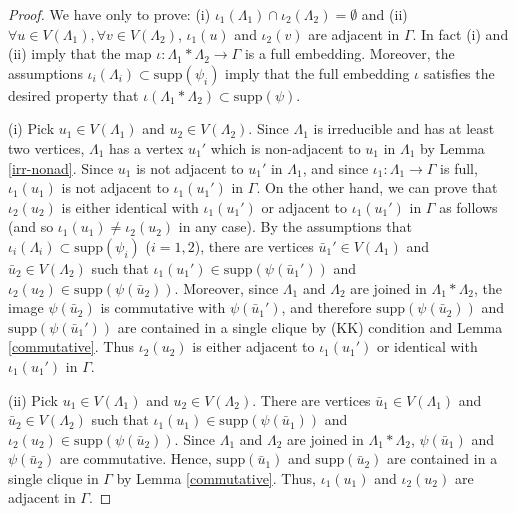 \documentclass{amsart}
\theoremstyle{definition}
\theoremstyle{plain}
\numberwithin{equation}{section}
\begin{document}
\begin{proof}
We have only to prove: (i) $\iota_1 (\Lambda_1) \cap \iota_2(\Lambda_2) = \emptyset$ and (ii) $\forall u \in V(\Lambda_1),  \forall v \in V(\Lambda_2)$, $\iota_1(u)$ and $\iota_2(v)$ are adjacent in $\Gamma$. 
In fact (i) and (ii) imply that the map $\iota \colon \Lambda_1 * \Lambda_2 \rightarrow \Gamma$ is a full embedding. 
Moreover, the assumptions $\iota_i(\Lambda_i) \subset \mathrm{supp}(\psi_i)$ imply that the full embedding $\iota$ satisfies the desired property that $\iota(\Lambda_1 * \Lambda_2) \subset \mathrm{supp}(\psi)$. 

(i) Pick $u_1 \in V(\Lambda_1)$ and $u_2 \in V(\Lambda_2)$. 
Since $\Lambda_1$ is irreducible and has at least two vertices, $\Lambda_1$ has a vertex $u_1'$ which is non-adjacent to $u_1$ in $\Lambda_1$ by Lemma \ref{irr-nonad}. 
Since $u_1$ is not adjacent to $u_1'$ in $\Lambda_1$, and since $\iota_1 \colon \Lambda_1 \rightarrow \Gamma$ is full, $\iota_1(u_1)$ is not adjacent to $\iota_1(u_1')$ in $\Gamma$. 
On the other hand, we can prove that $\iota_2(u_2)$ is either identical with $\iota_1(u_1')$ or adjacent to $\iota_1(u_1')$ in $\Gamma$ as follows (and so $\iota_1(u_1) \neq \iota_2(u_2)$ in any case).  
By the assumptions that $\iota_i(\Lambda_i) \subset \mathrm{supp}(\psi_i)$ ($i= 1,2$), there are vertices $\bar{u}_1' \in V(\Lambda_1)$ and $\bar{u}_2 \in V(\Lambda_2)$ such that $\iota_1(u_1') \in \mathrm{supp}(\psi(\bar{u}_1'))$ and $\iota_2(u_2) \in \mathrm{supp}(\psi(\bar{u}_2))$. 
Moreover, since $\Lambda_1$ and $\Lambda_2$ are joined in $\Lambda_1 * \Lambda_2$, the image $\psi(\bar{u}_2)$ is commutative with $\psi(\bar{u}_1')$, and therefore $\mathrm{supp}(\psi(\bar{u}_2))$ and $\mathrm{supp}(\psi(\bar{u}_1'))$ are contained in a single clique by (KK) condition and Lemma \ref{commutative}. 
Thus $\iota_2(u_2)$ is either adjacent to $\iota_1(u_1')$ or identical with $\iota_1(u_1')$ in $\Gamma$. 

(ii) Pick $u_1 \in V(\Lambda_1)$ and $u_2 \in V(\Lambda_2)$. 
There are vertices $\bar{u}_1 \in V(\Lambda_1)$ and $\bar{u}_2 \in V(\Lambda_2)$ such that $\iota_1(u_1) \in \mathrm{supp}(\psi(\bar{u}_1))$ and $\iota_2(u_2) \in \mathrm{supp}(\psi(\bar{u}_2))$. 
Since $\Lambda_1$ and $\Lambda_2$ are joined in $\Lambda_1 * \Lambda_2$, $\psi(\bar{u}_1)$ and $\psi(\bar{u}_2)$ are commutative. 
Hence, $\mathrm{supp}(\bar{u}_1)$ and $\mathrm{supp}(\bar{u}_2)$ are contained in a single clique in $\Gamma$ by Lemma \ref{commutative}. 
Thus, $\iota_1(u_1)$ and $\iota_2(u_2)$ are adjacent in $\Gamma$. 
\end{proof}
\end{document}
